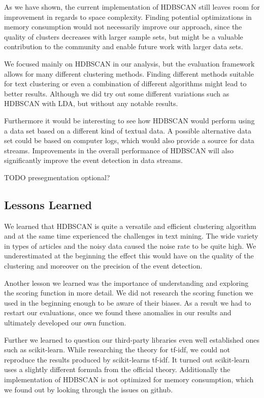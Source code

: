 As we have shown, the current implementation of HDBSCAN
still leaves room for improvement in regards to space complexity.
Finding potential optimizations in memory consumption would not necessarily improve our approach,
since the quality of clusters decreases with larger sample sets,
but might be a valuable contribution to the community and enable future work with larger data sets.

We focused mainly on HDBSCAN in our analysis, but the evaluation framework allows for many different clustering methods.
Finding different methods suitable for text clustering
or even a combination of different algorithms might lead to better results.
Although we did try out some different variations such as HDBSCAN with LDA,
but without any notable results.

Furthermore it would be interesting to see how HDBSCAN would perform
using a data set based on a different kind of textual data.
A possible alternative data set could be based on computer logs,
which would also provide a source for data streams.
Improvements in the overall performance of HDBSCAN will also significantly improve the event detection in data streams.

TODO presegmentation optional?

\subsection{Lessons Learned}
\label{subsec:6_lessons_learned}


We learned that HDBSCAN is quite a versatile and efficient clustering algorithm
and at the same time experienced the challenges in text mining. 
The wide variety in types of articles and the noisy data caused the noise rate to be quite high.
We underestimated at the beginning the effect this would have on the quality of the clustering 
and moreover on the precision of the event detection.

Another lesson we learned was the importance of understanding and exploring the scoring function in more detail.
We did not research the scoring function we used in the beginning enough to be aware of their biases.
As a result we had to restart our evaluations, once we found these anomalies in our results and 
ultimately developed our own function.  

Further we learned to question our third-party libraries even well established ones such as scikit-learn.
While researching the theory for tf-idf, we could not reproduce the results produced by scikit-learns tf-idf.
It turned out scikit-learn uses a slightly different formula from the official theory. 
Additionally the implementation of HDBSCAN is not optimized for memory consumption, 
which we found out by looking through the issues on github. 
